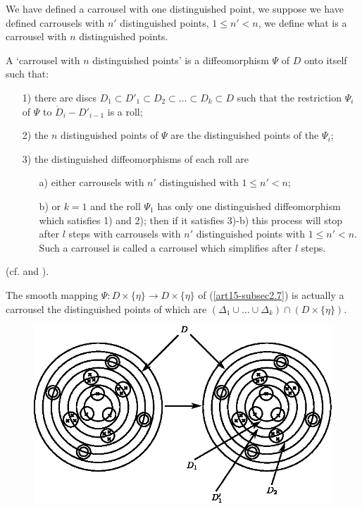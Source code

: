 We have defined a carrousel with one distinguished point, we suppose we have defined carrousels with $n'$ distinguished points, $1 \leqslant n' < n$, we define what is a carrousel with $n$ distinguished points.

\begin{definition}\label{art15-def2.10}
A `carrousel with $n$ distinguished points' is a diffeomorphism $\Psi$ of $D$ onto itself such that:
\begin{itemize}
\item[1)] there are discs $D_1 \subset D'_1 \subset D_2 \subset \ldots \subset D_k\subset D$ such that the restriction $\Psi_i$ of $\Psi$ to $\mathring{D}_i - D'_{i-1}$ is a roll;

\item[2)] the $n$ distinguished points of $\Psi$ are the distinguished points of the $\Psi_i$;

\item[3)] the distinguished diffeomorphisms of each roll are
\begin{itemize}
\item[a)] either carrousels with $n'$ distinguished with $1\leqslant n' < n$;

\item[b)] or $k=1$ and the roll $\Psi_1$ has only one distinguished diffeomorphism which satisfies 1) and 2); then if it satisfies 3)-b) this process will stop after $l$ steps with carrousels with $n'$ distinguished points with $1 \leqslant n' <n$. Such a carrousel is called a carrousel which simplifies after $l$ steps.
\end{itemize}
\end{itemize}
\end{definition}

\begin{example*}
(cf. \cite{art15-key6}\pageoriginale and \cite{art15-key7}).
\end{example*}

\setcounter{lemma}{10}
\begin{lemma}\label{art15-lem2.11}
The smooth mapping $\Psi: D \times \{\eta\} \to D \times \{ \eta\}$ of (\ref{art15-subsec2.7}) is actually a carrousel the distinguished points of which are $(\Delta_1 \cup \ldots \cup \Delta_k) \cap (D \times \{\eta\})$.
\begin{figure}[H]
\centering
\includegraphics{fig15-2.eps}
\end{figure}
\end{lemma}

